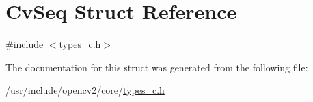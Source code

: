 \hypertarget{structCvSeq}{\section{Cv\-Seq Struct Reference}
\label{structCvSeq}
}


{\ttfamily \#include $<$types\-\_\-c.\-h$>$}



The documentation for this struct was generated from the following file\-:\begin{DoxyCompactItemize}
\item 
/usr/include/opencv2/core/\hyperlink{core_2types__c_8h}{types\-\_\-c.\-h}\end{DoxyCompactItemize}

